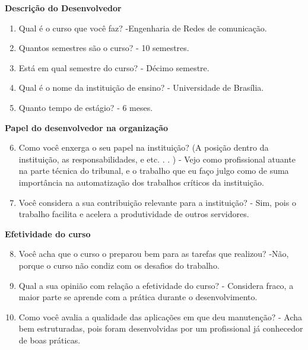 \begin{anexosenv}
\textbf{Descrição do Desenvolvedor}

\begin{enumerate}
\item Qual é o curso que você faz?\newline
-Engenharia de Redes de comunicação.
\item Quantos semestres são o curso?\newline
- 10 semestres.
\item Está em qual semestre do curso?\newline
- Décimo semestre.
\item Qual é o nome da instituição de ensino?\newline
- Universidade de Brasília.
\item Quanto tempo de estágio?\newline
- 6 meses.
\end{enumerate}

\textbf{Papel do desenvolvedor na organização}

\begin{enumerate}
\setcounter{enumi}{5}
\item Como você enxerga o seu papel na instituição? (A posição dentro da instituição, as
responsabilidades, e etc. . . )\newline
- Vejo como profissional atuante na parte técnica do tribunal, e o trabalho que eu faço julgo como de suma importância na automatização dos trabalhos críticos da instituição.
\item Você considera a sua contribuição relevante para a instituição?\newline
- Sim, pois o trabalho facilita e acelera a produtividade de outros servidores.
\end{enumerate}

\textbf{Efetividade do curso}

\begin{enumerate}
\setcounter{enumi}{7}
\item Você acha que o curso o preparou bem para as tarefas que realizou?\newline
-Não, porque o curso não condiz com os desafios do trabalho.
\item Qual a sua opinião com relação a efetividade do curso?\newline
- Considera fraco, a maior parte se aprende com a prática durante o desenvolvimento.
\item Como você avalia a qualidade das aplicações em que deu manutenção?\newline
- Acha bem estruturadas, pois foram desenvolvidas por um profissional já conhecedor de boas práticas.
\end{enumerate}


\end{anexosenv}

